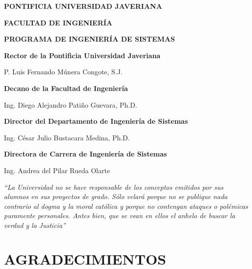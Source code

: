 \documentclass[12pt,letterpaper,oneside]{article}
\newcommand{\universidad}{PONTIFICIA UNIVERSIDAD JAVERIANA}
\newcommand{\universidadNombre}{Pontificia Universidad Javeriana} %
\newcommand{\facultad}{FACULTAD DE INGENIERÍA}
\newcommand{\programa}{PROGRAMA DE INGENIERÍA DE SISTEMAS}
\newcommand{\rector}{P. Luis Fernando Múnera Congote, S.J.}
\newcommand{\decano}{Ing. Diego Alejandro Patiño Guevara, Ph.D.}
\newcommand{\directorDepto}{Ing. César Julio Bustacara Medina, Ph.D.}
\newcommand{\directorCarrera}{Ing. Andrea del Pilar Rueda Olarte}
\begin{document}
\begin{center}
  {\bfseries \universidad}\par
  {\bfseries \facultad}\par
  {\bfseries \programa}\par
  \vspace{6cm}

  {\bfseries Rector de la \universidadNombre}\par
  \vspace{0.4cm}
  \rector\par
  \vspace{0.9cm}

  {\bfseries Decano de la Facultad de Ingeniería}\par
  \vspace{0.4cm}
  \decano\par
  \vspace{0.9cm}

  {\bfseries Director del Departamento de Ingeniería de Sistemas}\par
  \vspace{0.4cm}
  \directorDepto\par
  \vspace{0.9cm}

  {\bfseries Directora de Carrera de Ingeniería de Sistemas}\par
  \vspace{0.4cm}
  \directorCarrera\par
\end{center}
\clearpage

\vspace{1cm}

\begin{justify}
\itshape
``La Universidad no se hace responsable de los conceptos emitidos por sus alumnos en sus
proyectos de grado. Sólo velará porque no se publique nada contrario al dogma y la moral
católica y porque no contengan ataques o polémicas puramente personales. Antes bien, que se
vean en ellos el anhelo de buscar la verdad y la Justicia''
\end{justify}
\clearpage

\section*{AGRADECIMIENTOS}
\vspace{0.6cm}
\end{document}
